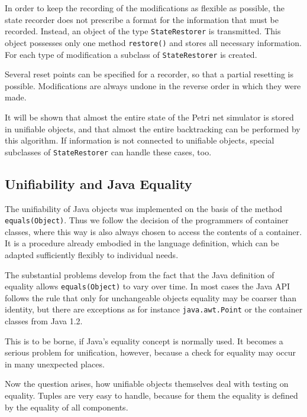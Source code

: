 In order to keep the recording of the modifications as flexible as 
possible, the state recorder does not prescribe a format for the information
that must be recorded. Instead, an object of the type 
\texttt{StateRestorer} is transmitted. This object possesses only one method 
\texttt{restore()} and stores all necessary information. For each 
type of modification a subclass of \texttt{StateRestorer} is created.  

Several reset points can be specified for a recorder, so that a partial 
resetting is possible. Modifications are always undone in the reverse 
order in which they were made. 

It will be shown that almost the entire state of the Petri net 
simulator is stored in unifiable objects, and that almost the 
entire backtracking can be performed by this algorithm.
If information is not connected to unifiable objects, special
subclasses of \texttt{StateRestorer} can handle these cases, too.


\subsection{Unifiability and Java Equality}

The unifiability of Java objects was implemented on the basis of the
method \texttt{equals(Object)}. 
Thus we follow the decision of the programmers of container classes, 
where this way is also always chosen to access the contents
of a container. It is a procedure already embodied in the 
language definition, which can be adapted sufficiently flexibly to 
individual needs. 

The substantial problems develop from the fact that the Java definition 
of equality allows \texttt{equals(Object)} to vary over time.
In most cases the Java API follows the rule that only for 
unchangeable objects equality may be coarser than identity, but 
there are exceptions as for instance \texttt{java.awt.Point} or the 
container classes from Java 1.2. 

This is to be borne, if Java's equality concept is normally used.
It becomes a serious problem for unification, however, because a check
for equality may occur in many unexpected places.

Now the question arises, how unifiable objects themselves deal 
with testing on equality. Tuples are very easy to handle, because 
for them the equality is defined by the equality of all components. 


